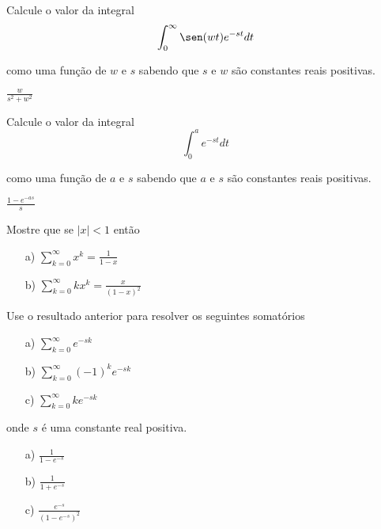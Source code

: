 \begin{exer}
Calcule o valor da integral
\begin{equation}\int_0^\infty \sen(wt) e^{-st}dt 
\end{equation}

como uma função de $w$ e $s$ sabendo que $s$ e $w$ são constantes reais positivas.
\end{exer}
\begin{resp}
 $\frac{w}{s^2+w^2}$
\end{resp}


\begin{exer} Calcule o valor da integral
\begin{equation}\int_0^a  e^{-st}dt
 \end{equation}

como uma função de $a$ e $s$ sabendo que $a$ e $s$ são constantes reais positivas.
\end{exer}
\begin{resp}
 $\frac{1-e^{-as}}{s}$
\end{resp}


\begin{exer}  Mostre que se $|x|<1$ então
\begin{itemize}
\item[a)] $\sum_{k=0}^\infty x^k=\frac{1}{1-x}$
\item[b)] $\sum_{k=0}^\infty kx^k=\frac{x}{(1-x)^2}$
\end{itemize}
\end{exer}

\begin{exer} Use o resultado anterior para resolver os seguintes somatórios
\begin{itemize}
\item[a)]$\sum_{k=0}^\infty e^{-sk}$
\item[b)]$\sum_{k=0}^\infty (-1)^ke^{-sk}$
\item[c)]$\sum_{k=0}^\infty ke^{-sk}$
\end{itemize}
onde $s$ é uma constante real positiva. 
\end{exer}
\begin{resp}
\begin{itemize}
  \item[a)]$\frac{1}{1-e^{-s}}$
  \item[b)]$\frac{1}{1+e^{-s}}$
  \item[c)]$\frac{e^{-s}}{\left(1-e^{-s}\right)^2}$
\end{itemize}
\end{resp}



